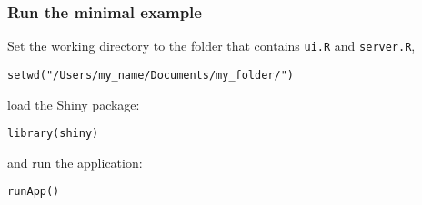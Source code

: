 \documentclass{beamer}
\begin{document}
	\begin{frame}[fragile]
		\frametitle{Run the minimal example}

		Set the working directory to the folder that contains \verb|ui.R| and \verb|server.R|,

		\vspace{1em}
		
		\begin{exampleblock}{}
		\begin{BVerbatim}
setwd("/Users/my_name/Documents/my_folder/")
		\end{BVerbatim}
		\end{exampleblock}{}

		\vspace{1em}

		load the Shiny package:

		\vspace{1em}
		
		\begin{exampleblock}{}
		\begin{BVerbatim}
library(shiny)
		\end{BVerbatim}
		\end{exampleblock}{}

		\vspace{1em}

		and run the application:

		\vspace{1em}
		
		\begin{exampleblock}{}
		\begin{BVerbatim}
runApp()
		\end{BVerbatim}
		\end{exampleblock}{}

	\end{frame}
\end{document}
